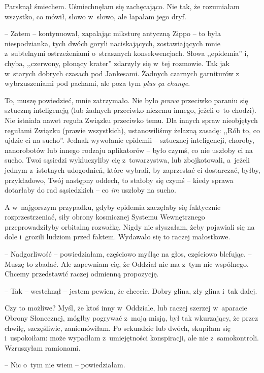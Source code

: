 \documentclass[oneside,polish,11pt,sfheadings]{mwbk}
\let\footnote=\endnote
\begin{document}
Parsknął śmiechem. Uśmiechnęłam się zachęcająco. Nie tak, że rozumiałam
wszystko, co mówił, słowo w~słowo, ale łapałam jego dryf.

-- Zatem -- kontynuował, zapalając miksturę antyczną Zippo -- to była
niespodzianka, tych dwóch goryli naciskających, zostawiających mnie z~subtelnymi ostrzeżeniami o~strasznych konsekwencjach. Słowa ,,epidemia''
i, chyba, ,,czerwony, płonący krater'' zdarzyły się w~tej rozmowie. Tak
jak w~starych dobrych czasach pod Jankesami. Żadnych czarnych garniturów
z wybrzuszeniami pod pachami, ale poza tym \textit{plus ça change}\footnote{ fr.
tym bardziej zmienia -- przyp.tłum.}.

To, muszę powiedzieć, mnie zatrzymało. Nie było \textit{prawa} przeciwko
paraniu się sztuczną inteligencją (lub żadnych przeciwko niczemu innego,
jeżeli o~to chodzi). Nie istniała nawet reguła Związku przeciwko temu.
Dla innych spraw nieobjętych regułami Związku (prawie wszystkich),
ustanowiliśmy żelazną zasadę: ,,Rób to, co ujdzie ci na sucho''. Jednak
wywołanie epidemii -- sztucznej inteligencji, choroby, nanorobotów lub
innego rodzaju aplikatorów -- było czymś, co nie uszłoby ci na sucho.
Twoi sąsiedzi wykluczyliby cię z~towarzystwa, lub zbojkotowali, a~jeżeli
jednym z~istotnych udogodnień, które wybrali, by zaprzestać ci
dostarczać, byłby, przykładowo, Twój następny oddech, to stałoby się
czymś -- kiedy sprawa dotarłaby do rad sąsiedzkich -- co \textit{im} uszłoby
na sucho.

A w~najgorszym przypadku, gdyby epidemia zaczęłaby się faktycznie
rozprzestrzeniać, siły obrony kosmicznej Systemu Wewnętrznego
przeprowadziłyby orbitalną rozwałkę. Nigdy nie słyszałam, żeby pojawiali
się na dole i~grozili ludziom przed faktem. Wydawało się to raczej
małostkowe.

-- Nadgorliwość -- powiedziałam, częściowo myśląc na głos, częściowo
blefując. -- Muszę to zbadać. Ale zapewniam cię, że Oddział nie ma z~tym
nic wspólnego. Chcemy przedstawić raczej odmienną propozycję.

-- Tak -- westchnął -- jestem pewien, że chcecie. Dobry glina, zły glina i~tak dalej.

Czy to możliwe? Myśl, że ktoś inny w~Oddziale, lub raczej szerzej w~aparacie Obrony Słonecznej, mógłby pogrywać z~moją misją, był tak
wkurzający, że przez chwilę, szczęśliwie, zaniemówiłam. Po sekundzie lub
dwóch, skupiłam się i~uspokoiłam: może wypadłam z~umiejętności
konspiracji, ale nie z~samokontroli. Wzruszyłam ramionami.

-- Nic o~tym nie wiem -- powiedziałam.
\end{document}
